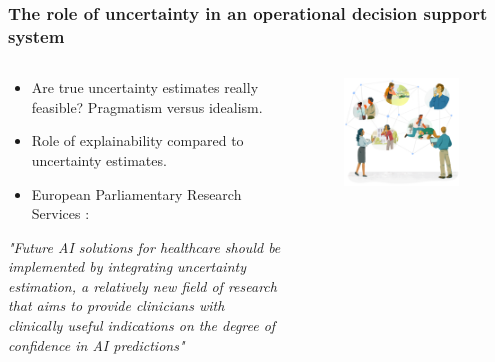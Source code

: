 \begin{frame}
    \frametitle{The role of uncertainty in an operational decision support system}
    \begin{columns}
        \begin{column}{0.6\textwidth}
            \begin{itemize}
                \item Are true uncertainty estimates really feasible? Pragmatism versus idealism.
                \item Role of explainability compared to uncertainty estimates.
                \item European Parliamentary Research Services \cite{europeanparliament_artificial_2022}:
            \end{itemize}
            \vspace{0.5em}
            \begin{center}
                {\itshape "Future AI solutions for healthcare should be implemented by integrating uncertainty estimation, a relatively new field of research that aims to provide clinicians with clinically useful indications on the degree of confidence in AI predictions"}
            \end{center}
        \end{column}
        \begin{column}{0.4\textwidth}
            \vspace{-2em}
            \begin{figure}[t]
                \centering
                \includegraphics[width=0.9\textwidth]{figures/corti_sketch_conversations.png}
            \end{figure}
        \end{column}
    \end{columns}


\end{frame}
